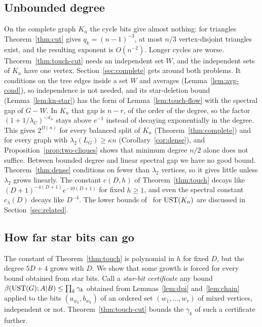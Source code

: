 \subsection{Unbounded degree}

On the complete graph $K_n$ the cycle bits give almost nothing: for triangles Theorem~\ref{thm:cut} gives $q_k=(n-1)^{-3}$, at most $n/3$ vertex-disjoint triangles exist, and the resulting exponent is $O(n^{-2})$. Longer cycles are worse. Theorem~\ref{thm:touch-cut} needs an independent set $W$, and the independent sets of $K_n$ have one vertex. Section~\ref{sec:complete} gets around both problems. It conditions on the tree edges inside a set $W$ and averages (Lemma~\ref{lem:avg-cond}), so independence is not needed, and its star-deletion bound (Lemma~\ref{lem:kn-star}) has the form of Lemma~\ref{lem:touch-flow} with the spectral gap of $G-W$. In $K_n$ that gap is $n-r$, of the order of the degree, so the factor $(1+1/\lambda_U)^{-d_A}$ stays above $e^{-1}$ instead of decaying exponentially in the degree. This gives $2^{\Omega(n)}$ for every balanced split of $K_n$ (Theorem~\ref{thm:complete}) and for every graph with $\lambda_2(L_G)\ge\kappa n$ (Corollary~\ref{cor:dense}), and Proposition~\ref{prop:two-cliques} shows that minimum degree $n/2$ alone does not suffice. Between bounded degree and linear spectral gap we have no good bound. Theorem~\ref{thm:dense} conditions on fewer than $\lambda_2$ vertices, so it gives little unless $\lambda_2$ grows linearly. The constant $c(D,h)$ of Theorem~\ref{thm:touch} decays like $(D+1)^{-4(D+1)}e^{-10(D+1)}$ for fixed $h\ge1$, and even the spectral constant $c_\lambda(D)$ decays like $D^{-4}$. The lower bounds of~\cite{MartensMedabalimi14,ZhangHoltzenVdB20} for $\mathrm{UST}(K_n)$ are discussed in Section~\ref{sec:related}.

\subsection{How far star bits can go}\label{sec:star-limits}

The constant of Theorem~\ref{thm:touch} is polynomial in $h$ for fixed $D$, but the degree $5D+4$ grows with $D$. We show that some growth is forced for every bound obtained from star bits. Call a \emph{star-bit certificate} any bound $\beta(\mathrm{UST}(G);A|B)\le\prod_k\gamma_k$ obtained from Lemmas~\ref{lem:dpi} and~\ref{lem:chain} applied to the bits $(a_{w_k},b_{w_k})$ of an ordered set $(w_1,\dots,w_r)$ of mixed vertices, independent or not. Theorem~\ref{thm:touch-cut} bounds the $\gamma_k$ of such a certificate further.

